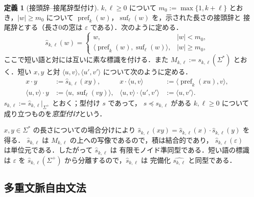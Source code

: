 \documentclass[11pt,a4paper]{ltjsarticle}
\numberwithin{equation}{section}
\theoremstyle{plain}
\theoremstyle{definition}
\newtheorem{definition}[theorem]{定義}
\theoremstyle{remark}
\newcommand{\eps}{\varepsilon}
\theoremstyle{plain}
\begin{document}
\begin{definition}[接頭辞--接尾辞型付け]
\label{def:prefix-suffix-typing}
$k,\ell\ge0$ について $m_0:=\max\{1,k+\ell\}$ とおき，$|w|\ge m_0$ について
$\operatorname{pref}_k(w)$，$\operatorname{suf}_\ell(w)$ を，示された長さの接頭辞と
接尾辞とする（長さ0の窓は $\eps$ である）．次のように定める．
\[
 \widehat{s}_{k,\ell}(w)=
 \begin{cases}
   w, & |w|<m_0,\\
   \langle\operatorname{pref}_k(w),\operatorname{suf}_\ell(w)\rangle,
      & |w|\ge m_0,
 \end{cases}
\]
ここで短い語と対には互いに素な標識を付ける．また
$M_{k,\ell}:=\widehat{s}_{k,\ell}(\Sigma^*)$ とおく．短い $x,y$ と対
$\langle u,v\rangle,\langle u',v'\rangle$ について次のように定める．
\[
\begin{aligned}
 x\cdot y&:=\widehat{s}_{k,\ell}(xy), &
 x\cdot\langle u,v\rangle&:=\langle\operatorname{pref}_k(xu),v\rangle,\\
 \langle u,v\rangle\cdot y&:=\langle u,\operatorname{suf}_\ell(vy)\rangle, &
 \langle u,v\rangle\cdot\langle u',v'\rangle&:=\langle u,v'\rangle.
\end{aligned}
\]
$s_{k,\ell}:=\widehat{s}_{k,\ell}|_{\Sigma^+}$ とおく；型付け $s$ であって，
$s\preceq s_{k,\ell}$ がある $k,\ell\ge0$ について成り立つものを\emph{窓型付け}という．
\end{definition}

$x,y\in\Sigma^*$ の長さについての場合分けにより
$\widehat{s}_{k,\ell}(xy)=\widehat{s}_{k,\ell}(x)\cdot\widehat{s}_{k,\ell}(y)$ を得る．
$\widehat{s}_{k,\ell}$ は $M_{k,\ell}$ の上への写像であるので，積は結合的であり，
$\widehat{s}_{k,\ell}(\eps)$ は単位元である．したがって $\widehat{s}_{k,\ell}$ は
有限モノイド準同型である．短い語の標識は $\eps$ を
$\widehat{s}_{k,\ell}(\Sigma^+)$ から分離するので，$\widehat{s}_{k,\ell}$ は
完備化 $\widehat{s_{k,\ell}}$ と同型である．

\subsection{多重文脈自由文法}
\end{document}
